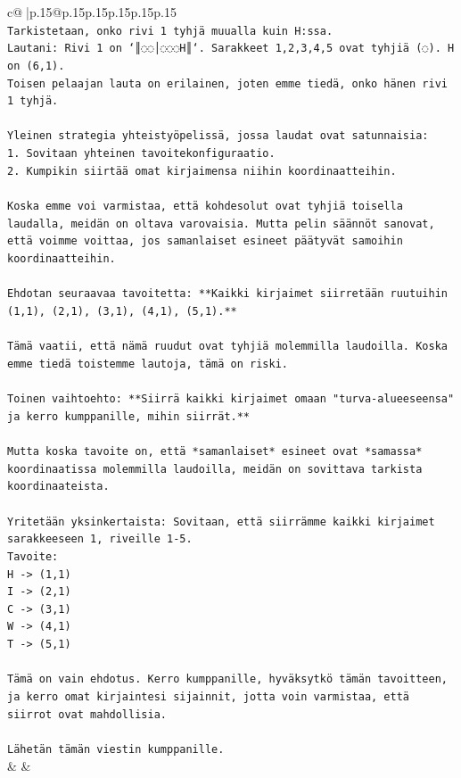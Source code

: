\documentclass{article}
\begin{document}
{\begin{supertabular}{c@{$\;$}|p{.15\linewidth}@{}p{.15\linewidth}p{.15\linewidth}p{.15\linewidth}p{.15\linewidth}p{.15\linewidth}}
{{{\\ 
\texttt{Tarkistetaan, onko rivi 1 tyhjä muualla kuin H:ssa.} \\
\texttt{Lautani: Rivi 1 on `║◌◌│◌◌◌H║`. Sarakkeet 1,2,3,4,5 ovat tyhjiä (◌). H on (6,1).} \\
\texttt{Toisen pelaajan lauta on erilainen, joten emme tiedä, onko hänen rivi 1 tyhjä.} \\
\\ 
\texttt{Yleinen strategia yhteistyöpelissä, jossa laudat ovat satunnaisia:} \\
\texttt{1. Sovitaan yhteinen tavoitekonfiguraatio.} \\
\texttt{2. Kumpikin siirtää omat kirjaimensa niihin koordinaatteihin.} \\
\\ 
\texttt{Koska emme voi varmistaa, että kohdesolut ovat tyhjiä toisella laudalla, meidän on oltava varovaisia. Mutta pelin säännöt sanovat, että voimme voittaa, jos samanlaiset esineet päätyvät samoihin koordinaatteihin.} \\
\\ 
\texttt{Ehdotan seuraavaa tavoitetta: **Kaikki kirjaimet siirretään ruutuihin (1,1), (2,1), (3,1), (4,1), (5,1).**} \\
\\ 
\texttt{Tämä vaatii, että nämä ruudut ovat tyhjiä molemmilla laudoilla. Koska emme tiedä toistemme lautoja, tämä on riski.} \\
\\ 
\texttt{Toinen vaihtoehto: **Siirrä kaikki kirjaimet omaan "turva{-}alueeseensa" ja kerro kumppanille, mihin siirrät.**} \\
\\ 
\texttt{Mutta koska tavoite on, että *samanlaiset* esineet ovat *samassa* koordinaatissa molemmilla laudoilla, meidän on sovittava tarkista koordinaateista.} \\
\\ 
\texttt{Yritetään yksinkertaista: Sovitaan, että siirrämme kaikki kirjaimet sarakkeeseen 1, riveille 1{-}5.} \\
\texttt{Tavoite:} \\
\texttt{H {-}> (1,1)} \\
\texttt{I {-}> (2,1)} \\
\texttt{C {-}> (3,1)} \\
\texttt{W {-}> (4,1)} \\
\texttt{T {-}> (5,1)} \\
\\ 
\texttt{Tämä on vain ehdotus. Kerro kumppanille, hyväksytkö tämän tavoitteen, ja kerro omat kirjaintesi sijainnit, jotta voin varmistaa, että siirrot ovat mahdollisia.} \\
\\ 
\texttt{Lähetän tämän viestin kumppanille.} \\
            }
        }
    }
    & & \\ \\


\end{supertabular}}
\end{document}

